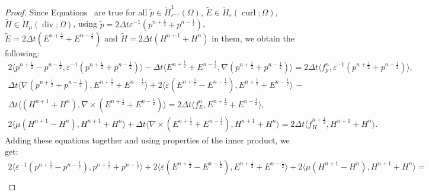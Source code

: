 \documentclass{amsart}
\theoremstyle{thmstyleone}%
\theoremstyle{thmstyletwo}%
\theoremstyle{thmstylethree}%
\DeclareMathOperator{\curl}{curl}
\def\divgn{\operatorname{div}}
\newcommand{\aInnerproduct}[2]{\bigl\langle #1, #2 \bigr\rangle}
\begin{document}
\begin{proof}
  Since Equations~ are true for all $\widetilde{p}\in \mathring{H}^1_{\varepsilon^{-1}}(\Omega)$, $\widetilde{E} \in \mathring{H}_{\varepsilon}(\curl; \Omega)$, $\widetilde{H} \in \mathring{H}_{\mu}(\divgn; \Omega)$, using $\widetilde{p} = 2 \Delta t \varepsilon^{-1} \left( p^{n + \frac{1}{2}} + p^{n - \frac{1}{2}} \right)$, $\widetilde{E} = 2 \Delta t \left(E^{n + \frac{1}{2}} + E^{n - \frac{1}{2}} \right)$ and $\widetilde{H} = 2 \Delta t \left(H^{n + 1} + H^n \right)$ in them, we obtain the following:
  \begin{multline*}
    2 \aInnerproduct{p^{n+\frac{1}{2}} - p^{n - \frac{1}{2}}}{\varepsilon^{-1} \left( p^{n + \frac{1}{2}} + p^{n-\frac{1}{2}} \right)} - \Delta t \aInnerproduct{E^{n + \frac{1}{2}} + E^{n - \frac{1}{2}}}{\nabla \left( p^{n + \frac{1}{2}} + p^{n - \frac{1}{2}} \right)} = 2 \Delta t \aInnerproduct{f_p^n}{\varepsilon^{-1} \left(p^{n + \frac{1}{2}} + p^{n - \frac{1}{2}}\right)},
\end{multline*}
\vspace{-1em} \begin{multline*}
  \Delta t \aInnerproduct{\nabla \left( p^{n + \frac{1}{2}} + p^{n - \frac{1}{2}} \right)}{E^{n + \frac{1}{2}} + E^{n - \frac{1}{2}}} + 2 \aInnerproduct{\varepsilon \left(E^{n + \frac{1}{2}} - E^{n - \frac{1}{2}} \right)}{E^{n + \frac{1}{2}} + E^{n - \frac{1}{2}}} \, - \\
  \Delta t \aInnerproduct{\left( H^{n + 1} + H^n \right)}{\nabla \times \left( E^{n + \frac{1}{2}} + E^{n - \frac{1}{2}} \right)} = 2 \Delta t \aInnerproduct{f_E^n}{E^{n + \frac{1}{2}} + E^{n - \frac{1}{2}}},
\end{multline*}
\vspace{-1em} \begin{multline*}
  2 \aInnerproduct{\mu \left(H^{n + 1} - H^{n} \right)}{H^{n + 1} + H^n} + \Delta t \aInnerproduct{\nabla \times \left( E^{n + \frac{1}{2}} + E^{n - \frac{1}{2}} \right)}{H^{n + 1} + H^n} = 2 \Delta t \aInnerproduct{f_H^{n + \frac{1}{2}}}{H^{n + 1} + H^n}.
\end{multline*}
Adding these equations together and using properties of the inner product, we get:
\begin{multline*}
  2 \aInnerproduct{\varepsilon^{-1} \left( p^{n + \frac{1}{2}} - p^{n - \frac{1}{2}} \right)}{p^{n + \frac{1}{2}} + p^{n - \frac{1}{2}}} + 2 \aInnerproduct{\varepsilon \left(E^{n + \frac{1}{2}} - E^{n - \frac{1}{2}} \right)}{E^{n + \frac{1}{2}} + E^{n - \frac{1}{2}}} + 2 \aInnerproduct{\mu \left( H^{n + 1} - H^{n} \right)}{H^{n + 1} + H^n} = \\

\end{multline*}
\end{proof}
\end{document}
